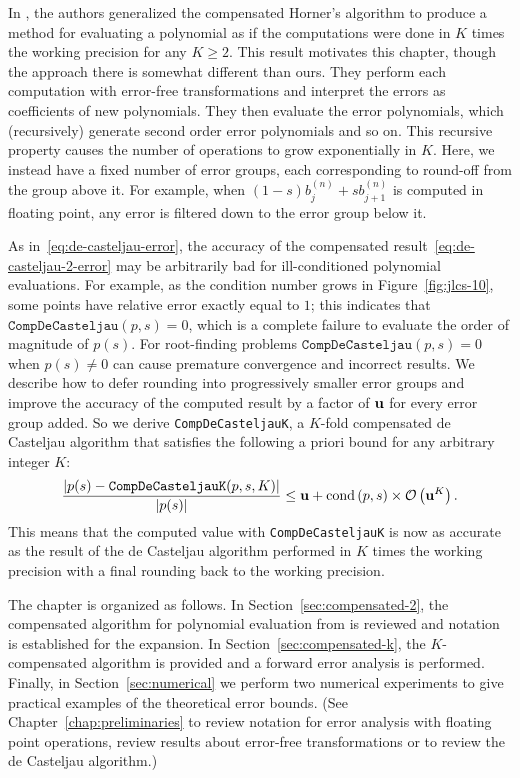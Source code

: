 In \cite{Graillat2009}, the authors generalized the compensated Horner's
algorithm to produce a method for evaluating a polynomial as if
the computations were done in \(K\) times the working precision for
any \(K \geq 2\). This result motivates this chapter, though the
approach there is somewhat different than ours. They perform each computation
with error-free transformations and interpret the errors as coefficients of new
polynomials. They then evaluate the error polynomials, which (recursively)
generate second order error polynomials and so on. This recursive property
causes the number of operations to grow exponentially in \(K\). Here, we
instead have a fixed number of error groups, each corresponding to round-off
from the group above it. For example, when
\((1 - s) b_j^{(n)} + s b_{j + 1}^{(n)}\) is computed in floating point, any
error is filtered down to the error group below it.

As in~\eqref{eq:de-casteljau-error}, the accuracy of the compensated
result~\eqref{eq:de-casteljau-2-error} may be arbitrarily bad for
ill-conditioned
polynomial evaluations. For example, as the condition number grows in
Figure~\ref{fig:jlcs-10}, some points have relative error exactly equal to
\(1\); this indicates that \\ \(\mathtt{CompDeCasteljau}(p, s) = 0\), which is
a complete failure to evaluate the order of magnitude of \(p(s)\). For
root-finding problems \(\mathtt{CompDeCasteljau}(p, s) = 0\) when
\(p(s) \neq 0\) can cause premature convergence and incorrect results.
We describe how to defer rounding into progressively
smaller error groups and improve the accuracy of the computed result by a
factor of \(\mathbf{u}\) for every error group added. So we derive
\texttt{CompDeCasteljauK}, a \(K\)-fold compensated de Casteljau algorithm
that satisfies the following a priori bound for any arbitrary integer \(K\):
\begin{equation}
  \frac{\left|p(s) - \mathtt{CompDeCasteljauK}(p, s, K)\right|}{
    \left|p(s)\right|} \leq \mathbf{u} + \operatorname{cond}\left(p, s\right) \times
    \mathcal{O}\left(\mathbf{u}^K\right).
\end{equation}
This means that the computed value with \texttt{CompDeCasteljauK} is now
as accurate as the result of the de Casteljau algorithm performed in
\(K\) times the working precision with a final rounding back to the
working precision.

The chapter is organized as follows. In Section~\ref{sec:compensated-2},
the compensated algorithm for polynomial evaluation from \cite{Jiang2010} is
reviewed and notation is established for the expansion. In
Section~\ref{sec:compensated-k}, the \(K\)-compensated algorithm is provided
and a forward error analysis is performed. Finally, in
Section~\ref{sec:numerical} we perform two numerical experiments to
give practical examples of the theoretical error bounds.
(See Chapter~\ref{chap:preliminaries} to review notation for error analysis
with floating point operations, review results about error-free
transformations or to review the de Casteljau algorithm.)

